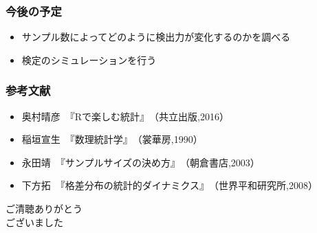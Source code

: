 \documentclass[dvipdfmx,14pt]{beamer}
\begin{document}
\begin{frame}
\frametitle{今後の予定}
\begin{itemize}
 \item サンプル数によってどのように検出力が変化するのかを調べる
 \item 検定のシミュレーションを行う
\end{itemize}
\end{frame}

\begin{frame}
\frametitle{参考文献}
\small
\begin{itemize}
 \item 奥村晴彦　『Rで楽しむ統計』　（共立出版,2016）
 \item 稲垣宣生　『数理統計学』　（裳華房,1990）
 \item 永田靖　『サンプルサイズの決め方』　（朝倉書店,2003）
 \item 下方拓　『格差分布の統計的ダイナミクス』　（世界平和研究所,2008）
\end{itemize}
\end{frame}

\begin{frame}
\begin{center}
\Large ご清聴ありがとう \\ ございました
\end{center}
\end{frame}
\end{document}
